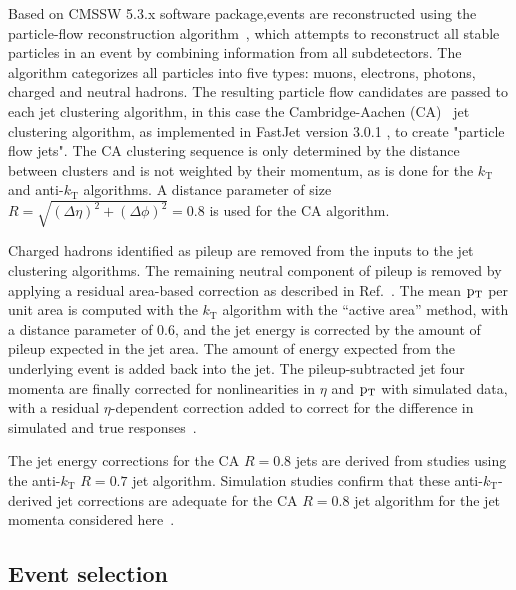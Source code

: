 Based on CMSSW 5.3.x software package,events are reconstructed using the particle-flow reconstruction
algorithm~\cite{particleflow}, which attempts to reconstruct all
stable particles in an event by combining information from all
subdetectors. The algorithm categorizes all particles into five types:
muons, electrons, photons, charged and neutral hadrons. The resulting
particle flow candidates are passed to each jet clustering algorithm, in this case the
Cambridge-Aachen (CA)~\cite{CAaachen,CAcambridge}
jet clustering algorithm, as implemented in FastJet version 3.0.1 \cite{fastjet1,fastjet},
to create "particle flow jets".
The CA clustering sequence is only determined by the distance between
clusters and is not weighted by their momentum, as is done for the
$k_\text{T}$ and anti-$k_\text{T}$ algorithms. A distance parameter of
size $R=\sqrt{(\Delta \eta)^2 + (\Delta\phi)^2}=0.8$ is used for the CA algorithm.


Charged hadrons identified as pileup are removed from the inputs to
the jet clustering algorithms.  The remaining neutral component of pileup
is removed by applying a residual area-based correction as
described in Ref.~\cite{jetarea_fastjet,jetarea_fastjet_pu}.  The mean
$\mathrm{p_{T}}$ per unit area is computed with the $k_{\mathrm T}$ algorithm
with the ``active area'' method, with a distance parameter of 0.6, and
the jet energy is corrected by the amount of pileup expected in the
jet area. The amount of energy expected from the underlying event is
added back into the jet.  The pileup-subtracted jet four momenta are
finally corrected for nonlinearities in $\eta$ and $\mathrm{p_{T}}$ with
simulated data, with a residual $\eta$-dependent correction added to
correct for the difference in simulated and true
responses~\cite{JME-JINST,Collaboration:2012dp}.

The jet energy corrections for the CA $R=0.8$ jets are derived from studies using the
anti-$k_{\mathrm T}$ $R=0.7$ jet algorithm. Simulation studies confirm that these
anti-$k_{\mathrm T}$-derived jet corrections
are adequate for the CA $R=0.8$ jet algorithm for the jet momenta
considered here~\cite{topwtag_pas}.%


\subsection{Event selection}
\label{event_selection}


